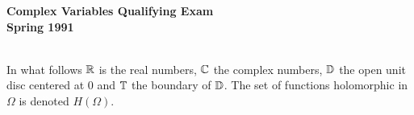 \documentclass{article}
\begin{document}






\begin{center}\begin{LARGE}
{\bf Complex Variables Qualifying Exam}\\ 
{\bf Spring 1991}\\ \end{LARGE}
\end{center}
\vspace{0.1in}
\noindent\hrulefill\\
In what follows $\Bbb R$ is the real numbers, $\Bbb C$ the complex numbers,
$\Bbb D$ the open unit disc centered at 0 and $\Bbb T$ the boundary of
$\Bbb D$. The set of functions holomorphic in $\Omega$ is denoted
$H (\Omega)$.
\end{document}
